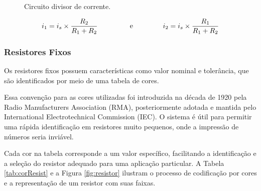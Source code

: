 \documentclass[12pt]{article}
\begin{document}
    \begin{figure}[H]
        \centering
        \caption{Circuito divisor de corrente.}
        \label{fig:divisor-corrente}
    \end{figure}

    \begin{equation}
        i_1=i_s\times\frac{R_2}{R_1+R_2}\text{\hspace{1.5cm} e\hspace{1.5cm}}i_2=i_s\times\frac{R_1}{R_1+R_2}
        \label{eq:divisor-de-corrente}
    \end{equation}

    \subsubsection{Resistores Fixos}
    Os resistores fixos possuem características como valor nominal e tolerância, que são identificados por meio de uma tabela de cores.
    
    Essa convenção para as cores utilizadas foi introduzida na década de 1920 pela Radio Manufacturers Association (RMA), posteriormente adotada e mantida pelo International Electrotechnical Commission (IEC). O sistema é útil para permitir uma rápida identificação em resistores muito pequenos, onde a impressão de números seria inviável.

    Cada cor na tabela corresponde a um valor específico, facilitando a identificação e a seleção do resistor adequado para uma aplicação particular. A Tabela \ref{tab:corResist} e a Figura \ref{fig:resistor} ilustram o processo de codificação por cores e a representação de um resistor com suas faixas.
    
\end{document}
